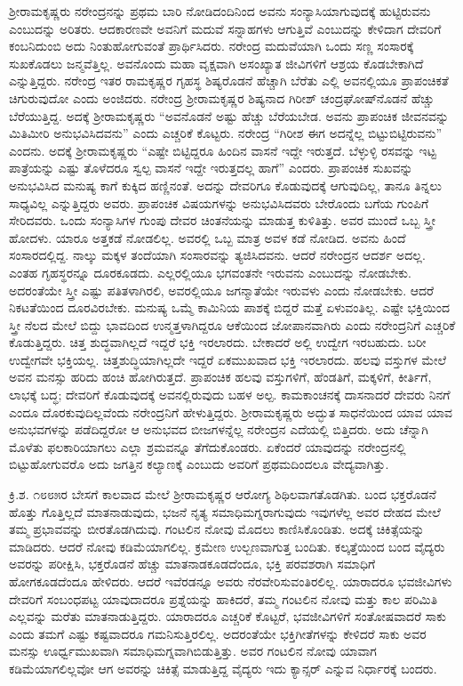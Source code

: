 ಶ‍್ರೀರಾಮಕೃಷ್ಣರು ನರೇಂದ್ರನನ್ನು ಪ್ರಥಮ ಬಾರಿ ನೋಡಿದಂದಿನಿಂದ ಅವನು ಸಂನ್ಯಾಸಿಯಾಗುವುದಕ್ಕೆ ಹುಟ್ಟಿರುವನು ಎಂಬುದನ್ನು ಅರಿತರು. ಆದಕಾರಣವೇ ಅವನಿಗೆ ಮದುವೆ ಸನ್ನಾಹಗಳು ಆಗುತ್ತಿವೆ ಎಂಬುದನ್ನು ಕೇಳಿದಾಗ ದೇವರಿಗೆ ಕಂಬನಿದುಂಬಿ ಅದು ನಿಂತುಹೋಗುವಂತೆ ಪ್ರಾರ್ಥಿಸಿದರು. ನರೇಂದ್ರ ಮದುವೆಯಾಗಿ ಒಂದು ಸಣ್ಣ ಸಂಸಾರಕ್ಕೆ ಸುಖಕೊಡಲು ಜನ್ಮವೆತ್ತಿಲ್ಲ. ಅವನೊಂದು ಮಹಾ ವೃಕ್ಷವಾಗಿ ಅಸಂಖ್ಯಾತ ಜೀವಿಗಳಿಗೆ ಆಶ್ರಯ ಕೊಡಬೇಕಾಗಿದೆ ಎನ್ನುತ್ತಿದ್ದರು. ನರೇಂದ್ರ ಇತರ ರಾಮಕೃಷ್ಣರ ಗೃಹಸ್ಥ ಶಿಷ್ಯರೊಡನೆ ಹೆಚ್ಚಾಗಿ ಬೆರೆತು ಎಲ್ಲಿ ಅವನಲ್ಲಿಯೂ ಪ್ರಾಪಂಚಿಕತೆ ಚಿಗುರುವುದೋ ಎಂದು ಅಂಜಿದರು. ನರೇಂದ್ರ ಶ‍್ರೀರಾಮಕೃಷ್ಣರ ಶಿಷ್ಯನಾದ ಗಿರೀಶ್ ಚಂದ್ರಘೋಷ್‍ನೊಡನೆ ಹೆಚ್ಚು ಬೆರೆಯುತ್ತಿದ್ದ. ಅದಕ್ಕೆ ಶ‍್ರೀರಾಮಕೃಷ್ಣರು “ಅವನೊಡನೆ ಅಷ್ಟು ಹೆಚ್ಚು ಬೆರೆಯಬೇಡ. ಅವನು ಪ್ರಾಪಂಚಿಕ ಜೀವನವನ್ನು ಮಿತಿಮೀರಿ ಅನುಭವಿಸಿದವನು” ಎಂದು ಎಚ್ಚರಿಕೆ ಕೊಟ್ಟರು. ನರೇಂದ್ರ “ಗಿರೀಶ ಈಗ ಅದನ್ನೆಲ್ಲ ಬಿಟ್ಟುಬಿಟ್ಟಿರುವನು” ಎಂದನು. ಅದಕ್ಕೆ ಶ‍್ರೀರಾಮಕೃಷ್ಣರು “ಎಷ್ಟೇ ಬಿಟ್ಟಿದ್ದರೂ ಹಿಂದಿನ ವಾಸನೆ ಇದ್ದೇ ಇರುತ್ತದೆ. ಬೆಳ್ಳುಳ್ಳಿ ರಸವನ್ನು ಇಟ್ಟ ಪಾತ್ರೆಯನ್ನು ಎಷ್ಟು ತೊಳೆದರೂ ಸ್ವಲ್ಪ ವಾಸನೆ ಇದ್ದೇ ಇರುತ್ತದಲ್ಲ ಹಾಗೆ” ಎಂದರು. ಪ್ರಾಪಂಚಿಕ ಸುಖವನ್ನು ಅನುಭವಿಸಿದ ಮನುಷ್ಯ ಕಾಗೆ ಕುಕ್ಕಿದ ಹಣ್ಣಿನಂತೆ. ಅದನ್ನು ದೇವರಿಗೂ ಕೊಡುವುದಕ್ಕೆ ಆಗುವುದಿಲ್ಲ, ತಾನೂ ತಿನ್ನಲು ಸಾಧ್ಯವಿಲ್ಲ ಎನ್ನುತ್ತಿದ್ದರು ಅವರು. ಪ್ರಾಪಂಚಿಕ ವಿಷಯಗಳನ್ನು ಅನುಭವಿಸಿದವರು ಬೇರೊಂದು ಬಗೆಯ ಗುಂಪಿಗೆ ಸೇರಿದವರು. ಒಂದು ಸಂನ್ಯಾಸಿಗಳ ಗುಂಪು ದೇವರ ಚಿಂತನೆಯನ್ನು ಮಾಡುತ್ತ ಕುಳಿತಿತ್ತು. ಅವರ ಮುಂದೆ ಒಬ್ಬ ಸ್ತ್ರೀ ಹೋದಳು. ಯಾರೂ ಅತ್ತಕಡೆ ನೋಡಲಿಲ್ಲ. ಅವರಲ್ಲಿ ಒಬ್ಬ ಮಾತ್ರ ಅವಳ ಕಡೆ ನೋಡಿದ. ಅವನು ಹಿಂದೆ ಸಂಸಾರದಲ್ಲಿದ್ದ. ನಾಲ್ಕು ಮಕ್ಕಳ ತಂದೆಯಾಗಿ ಸಂಸಾರವನ್ನು ತ್ಯಜಿಸಿದವನು. ಆದರೆ ನರೇಂದ್ರನ ಆದರ್ಶ ಅದಲ್ಲ. ಎಂತಹ ಗೃಹಸ್ಥರನ್ನೂ ದೂರಕೂಡದು. ಎಲ್ಲರಲ್ಲಿಯೂ ಭಗವಂತನೇ ಇರುವನು ಎಂಬುದನ್ನು ನೋಡಬೇಕು. ಅದರಂತೆಯೇ ಸ್ತ್ರೀ ಎಷ್ಟು ಪತಿತಳಾಗಿರಲಿ, ಅವರಲ್ಲಿಯೂ ಜಗನ್ಮಾತೆಯೇ ಇರುವಳು ಎಂದು ನೋಡಬೇಕು. ಆದರೆ ನಿಕಟತೆಯಿಂದ ದೂರವಿರಬೇಕು. ಮನುಷ್ಯ ಒಮ್ಮೆ ಕಾಮಿನಿಯ ಪಾಶಕ್ಕೆ ಬಿದ್ದರೆ ಮತ್ತೆ ಏಳುವಂತಿಲ್ಲ. ಎಷ್ಟೇ ಭಕ್ತಿಯಿಂದ ಸ್ತ್ರೀ ನೆಲದ ಮೇಲೆ ಬಿದ್ದು ಭಾವದಿಂದ ಉನ್ಮತ್ತಳಾಗಿದ್ದರೂ ಆಕೆಯಿಂದ ಜೋಪಾನವಾಗಿರು ಎಂದು ನರೇಂದ್ರನಿಗೆ ಎಚ್ಚರಿಕೆ ಕೊಡುತ್ತಿದ್ದರು. ಚಿತ್ತ ಶುದ್ಧವಾಗಿಲ್ಲದೆ ಇದ್ದರೆ ಭಕ್ತಿ ಇರಲಾರದು. ಬೇಕಾದರೆ ಅಲ್ಲಿ ಉದ್ವೇಗ ಇರಬಹುದು. ಬರೀ ಉದ್ವೇಗವೇ ಭಕ್ತಿಯಲ್ಲ. ಚಿತ್ತಶುದ್ಧಿಯಾಗಿಲ್ಲದೇ ಇದ್ದರೆ ಏಕಮುಖವಾದ ಭಕ್ತಿ ಇರಲಾರದು. ಹಲವು ವಸ್ತುಗಳ ಮೇಲೆ ಅವನ ಮನಸ್ಸು ಹರಿದು ಹಂಚಿ ಹೋಗಿರುತ್ತದೆ. ಪ್ರಾಪಂಚಿಕ ಹಲವು ವಸ್ತುಗಳಿಗೆ, ಹೆಂಡತಿಗೆ, ಮಕ್ಕಳಿಗೆ, ಕೀರ್ತಿಗೆ, ಲಾಭಕ್ಕೆ ಬದ್ಧ; ದೇವರಿಗೆ ಕೊಡುವುದಕ್ಕೆ ಅವನಲ್ಲಿರುವುದು ಬಹಳ ಅಲ್ಪ. ಕಾಮಕಾಂಚನಕ್ಕೆ ದಾಸನಾದರೆ ದೇವರು ನಿನಗೆ ಎಂದೂ ದೊರಕುವುದಿಲ್ಲವೆಂದು ನರೇಂದ್ರನಿಗೆ ಹೇಳುತ್ತಿದ್ದರು. ಶ‍್ರೀರಾಮಕೃಷ್ಣರು ಅದ್ಭುತ ಸಾಧನೆಯಿಂದ ಯಾವ ಯಾವ ಅನುಭವಗಳನ್ನು ಪಡೆದಿದ್ದರೋ ಆ ಅನುಭವದ ಬೀಜಗಳನ್ನೆಲ್ಲ ನರೇಂದ್ರನ ಎದೆಯಲ್ಲಿ ಬಿತ್ತಿದರು. ಅದು ಚೆನ್ನಾಗಿ ಮೊಳೆತು ಫಲಕಾರಿಯಾಗಲು ಎಲ್ಲಾ ಶ್ರಮವನ್ನೂ ತೆಗೆದುಕೊಂಡರು. ಏಕೆಂದರೆ ಯಾವುದನ್ನು ನರೇಂದ್ರನಲ್ಲಿ ಬಿಟ್ಟುಹೋಗುವರೊ ಅದು ಜಗತ್ತಿನ ಕಲ್ಯಾಣಕ್ಕೆ ಎಂಬುದು ಅವರಿಗೆ ಪ್ರಥಮದಿಂದಲೂ ವೇದ್ಯವಾಗಿತ್ತು.

ಕ್ರಿ.ಶ. ೧೮೮೫ರ ಬೇಸಗೆ ಕಾಲವಾದ ಮೇಲೆ ಶ‍್ರೀರಾಮಕೃಷ್ಣರ ಆರೋಗ್ಯ ಶಿಥಿಲವಾಗತೊಡಗಿತು. ಬಂದ ಭಕ್ತರೊಡನೆ ಹೊತ್ತು ಗೊತ್ತಿಲ್ಲದೆ ಮಾತನಾಡುವುದು, ಭಜನೆ ನೃತ್ಯ ಸಮಾಧಿಮಗ್ನರಾಗುವುದು ಇವುಗಳೆಲ್ಲ ಅವರ ದೇಹದ ಮೇಲೆ ತಮ್ಮ ಪ್ರಭಾವವನ್ನು ಬೀರತೊಡಗಿದುವು. ಗಂಟಲಿನ ನೋವು ಮೊದಲು ಕಾಣಿಸಿಕೊಂಡಿತು. ಅದಕ್ಕೆ ಚಿಕಿತ್ಸೆಯನ್ನು ಮಾಡಿದರು. ಆದರೆ ನೋವು ಕಡಿಮೆಯಾಗಲಿಲ್ಲ. ಕ್ರಮೇಣ ಉಲ್ಬಣವಾಗುತ್ತ ಬಂದಿತು. ಕಲ್ಕತ್ತೆಯಿಂದ ಬಂದ ವೈದ್ಯರು ಅವರನ್ನು ಪರೀಕ್ಷಿಸಿ, ಭಕ್ತರೊಡನೆ ಹೆಚ್ಚು ಮಾತನಾಡಕೂಡದೆಂದೂ, ಭಕ್ತಿ ಪರವಶರಾಗಿ ಸಮಾಧಿಗೆ ಹೋಗಕೂಡದೆಂದೂ ಹೇಳಿದರು. ಆದರೆ ಇವೆರಡನ್ನೂ ಅವರು ನೆರವೇರಿಸುವಂತಿರಲಿಲ್ಲ. ಯಾರಾದರೂ ಭವಜೀವಿಗಳು ದೇವರಿಗೆ ಸಂಬಂಧಪಟ್ಟ ಯಾವುದಾದರೂ ಪ್ರಶ್ನೆಯನ್ನು ಹಾಕಿದರೆ, ತಮ್ಮ ಗಂಟಲಿನ ನೋವು ಮತ್ತು ಕಾಲ ಪರಿಮಿತಿ ಎಲ್ಲವನ್ನು ಮರೆತು ಮಾತನಾಡುತ್ತಿದ್ದರು. ಯಾರಾದರೂ ಎಚ್ಚರಿಕೆ ಕೊಟ್ಟರೆ, ಭವಜೀವಿಗಳಿಗೆ ಸಂತೋಷವಾದರೆ ಸಾಕು ಎಂದು ತಮಗೆ ಎಷ್ಟು ಕಷ್ಟವಾದರೂ ಗಮನಿಸುತ್ತಿರಲಿಲ್ಲ. ಅದರಂತೆಯೇ ಭಕ್ತಿಗೀತೆಗಳನ್ನು ಕೇಳಿದರೆ ಸಾಕು ಅವರ ಮನಸ್ಸು ಊರ್ಧ್ವಮುಖವಾಗಿ ಸಮಾಧಿಮಗ್ನವಾಗಿಬಿಡುತ್ತಿತ್ತು. ಅವರ ಗಂಟಲಿನ ನೋವು ಯಾವಾಗ ಕಡಿಮೆಯಾಗಲಿಲ್ಲವೋ ಆಗ ಅವರನ್ನು ಚಿಕಿತ್ಸೆ ಮಾಡುತ್ತಿದ್ದ ವೈದ್ಯರು ಇದು ಕ್ಯಾನ್ಸರ್ ಎನ್ನುವ ನಿರ್ಧಾರಕ್ಕೆ ಬಂದರು.

